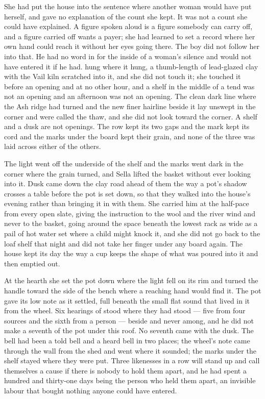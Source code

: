 She had put the house into the sentence where another woman would have put herself, and gave no explanation of the count she kept. It was not a count she could have explained. A figure spoken aloud is a figure somebody can carry off, and a figure carried off wants a payer; she had learned to set a record where her own hand could reach it without her eyes going there. The boy did not follow her into that. He had no word in  for the inside of a woman's silence and would not have entered it if he had.  hung where it hung, a thumb-length of lead-glazed clay with the Vail kiln scratched into it, and she did not touch it; she touched it before an opening and at no other hour, and a shelf in the middle of a tend was not an opening and an afternoon was not an opening. The clean dark line where the Ash ridge had turned and the new finer hairline beside it lay unswept in the corner and were called the thaw, and she did not look toward the corner. A shelf and a dusk are not openings. The row kept its two gaps and the mark kept its cord and the marks under the board kept their grain, and none of the three was laid across either of the others.

\scenebreak

The light went off the underside of the shelf and the marks went dark in the corner where the grain turned, and Sella lifted the basket without ever looking into it. Dusk came down the clay road ahead of them the way a pot's shadow crosses a table before the pot is set down, so that they walked into the house's evening rather than bringing it in with them. She carried him at the half-pace from every open slate, giving the instruction to the wool and the river wind and never to the basket, going around the space beneath the lowest rack as wide as a pail of hot water set where a child might knock it, and she did not go back to the loaf shelf that night and did not take her finger under any board again. The house kept its day the way a cup keeps the shape of what was poured into it and then emptied out.

At the hearth she set the pot down where the light fell on its rim and turned the handle toward the side of the bench where a reaching hand would find it. The pot gave its low note as it settled, full beneath the small flat sound that lived in it from the wheel. Six hearings of  stood where they had stood --- five from four sources and the sixth from a person --- beside and never among, and he did not make a seventh of the pot under this roof. No seventh came with the dusk. The bell had been a told bell and a heard bell in two places; the wheel's note came through the wall from the shed and went where it sounded; the marks under the shelf stayed where they were put. Three likenesses in a row will stand up and call themselves a cause if there is nobody to hold them apart, and he had spent a hundred and thirty-one days being the person who held them apart, an invisible labour that bought nothing anyone could have entered.

